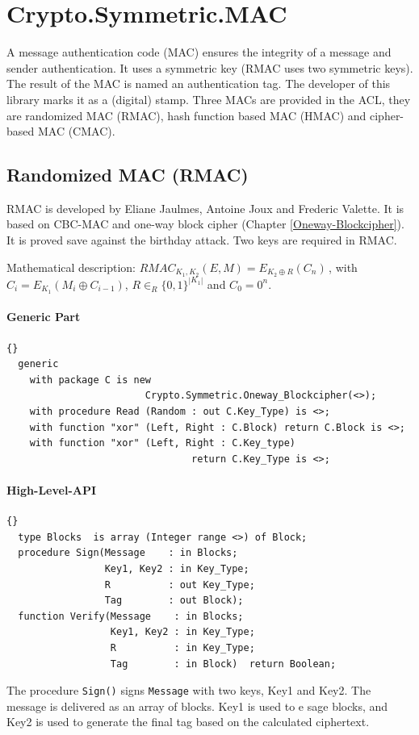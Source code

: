 \chapter{Crypto.Symmetric.MAC}\label{MAC}
A message authentication code (MAC) ensures the integrity of a message
and sender authentication. It uses a symmetric key (RMAC uses two
symmetric keys). The result of the MAC is named an authentication
tag. The developer of this library marks it as a (digital)
stamp. Three MACs are provided in the ACL, they are randomized MAC
(RMAC), hash function based MAC (HMAC) and cipher-based MAC (CMAC).


\section{Randomized MAC (RMAC)}
RMAC is developed by Eliane Jaulmes, Antoine Joux and Frederic
Valette. It is based on CBC-MAC and one-way block cipher (Chapter
\ref{Oneway-Blockcipher}). It is proved save against the birthday
attack. Two keys are required in RMAC.

 Mathematical description: $RMAC_{K_1,K_2}(E,M)=E_{K_2\oplus
   R}(C_n)$\,, with $C_i=E_{K_1}(M_i\oplus C_{i-1})$,
 $R\in_R\{0,1\}^{|K_1|}$ and $C_0=0^n$.

\subsubsection*{Generic Part}
\begin{lstlisting}{}
  generic
    with package C is new
    					Crypto.Symmetric.Oneway_Blockcipher(<>);
    with procedure Read (Random : out C.Key_Type) is <>;
    with function "xor" (Left, Right : C.Block) return C.Block is <>;
    with function "xor" (Left, Right : C.Key_type)
     							return C.Key_Type is <>;
\end{lstlisting}

\subsubsection*{High-Level-API}
\begin{lstlisting}{}
  type Blocks  is array (Integer range <>) of Block;
  procedure Sign(Message    : in Blocks;
                 Key1, Key2 : in Key_Type;
                 R          : out Key_Type;
                 Tag        : out Block);
  function Verify(Message    : in Blocks;
                  Key1, Key2 : in Key_Type;
                  R          : in Key_Type;
                  Tag        : in Block)  return Boolean;
\end{lstlisting}
The procedure \texttt{Sign()} signs \texttt{Message} with two keys,
Key1 and Key2. The message is delivered as an array of blocks. Key1 is
used to e sage blocks, and Key2 is used to generate
the final tag based on the calculated ciphertext.

